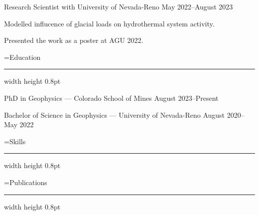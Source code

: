 \noindent
{\twelverm\fontspacing Research Scientist with University of Nevada-Reno}
\hfill{\eightit\fontspacing May 2022--August 2023}

\kern-4pt
\beginenumerate
\item Modelled influcence of glacial loads on hydrothermal system activity.
\item Presented the work as a poster at AGU 2022.
\endenumerate

=\hbox{\sixteenrm\fontspacing Education}
{}
\kern1.5pt
\hrule width  height 0.8pt
\medskip

\noindent
{\twelverm\fontspacing PhD in Geophysics --- Colorado School of Mines}
\hfill{\eightit\fontspacing August 2023--Present}

\kern2pt
\noindent
{}
\medskip

\noindent
{\twelverm\fontspacing Bachelor of Science in Geophysics --- University of Nevada-Reno}
\hfill{\eightit\fontspacing August 2020--May 2022}
\medskip

=\hbox{\sixteenrm\fontspacing Skills}
{}
\kern1.5pt
\hrule width  height 0.8pt
\medskip

=\hbox{\sixteenrm\fontspacing Publications}
{}
\kern1.5pt
\hrule width  height 0.8pt
\medskip

\bye
